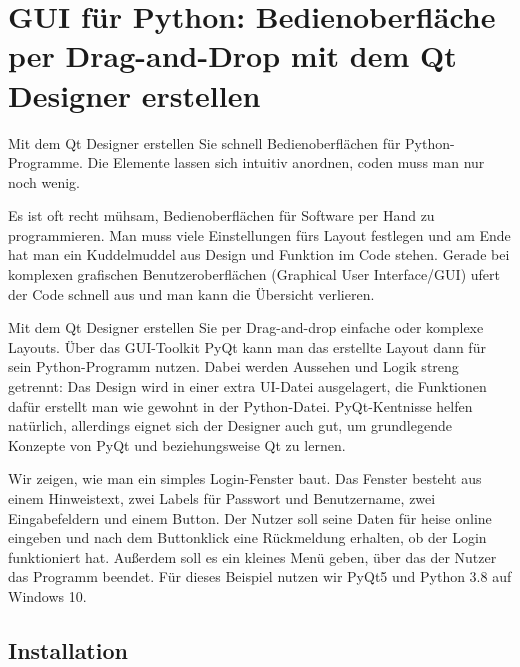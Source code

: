 %
%
%



\chapter{GUI für Python: Bedienoberfläche per Drag-and-Drop mit dem Qt Designer erstellen}

Mit dem Qt Designer erstellen Sie schnell Bedienoberflächen für Python-Programme. Die Elemente lassen sich intuitiv anordnen, coden muss man nur noch wenig.

Es ist oft recht mühsam, Bedienoberflächen für Software per Hand zu programmieren. Man muss viele Einstellungen fürs Layout festlegen und am Ende hat man ein Kuddelmuddel aus Design und Funktion im Code stehen. Gerade bei komplexen grafischen Benutzeroberflächen (Graphical User Interface/GUI) ufert der Code schnell aus und man kann die Übersicht verlieren.

Mit dem Qt Designer erstellen Sie per Drag-and-drop einfache oder komplexe Layouts. Über das GUI-Toolkit PyQt kann man das erstellte Layout dann für sein Python-Programm nutzen. Dabei werden Aussehen und Logik streng getrennt: Das Design wird in einer extra UI-Datei ausgelagert, die Funktionen dafür erstellt man wie gewohnt in der Python-Datei. PyQt-Kentnisse helfen natürlich, allerdings eignet sich der Designer auch gut, um grundlegende Konzepte von PyQt und beziehungsweise Qt zu lernen.

Wir zeigen, wie man ein simples Login-Fenster baut. Das Fenster besteht aus einem Hinweistext, zwei Labels für Passwort und Benutzername, zwei Eingabefeldern und einem Button. Der Nutzer soll seine Daten für heise online eingeben und nach dem Buttonklick eine Rückmeldung erhalten, ob der Login funktioniert hat. Außerdem soll es ein kleines Menü geben, über das der Nutzer das Programm beendet. Für dieses Beispiel nutzen wir PyQt5 und Python 3.8 auf Windows 10.

\section{Installation}

